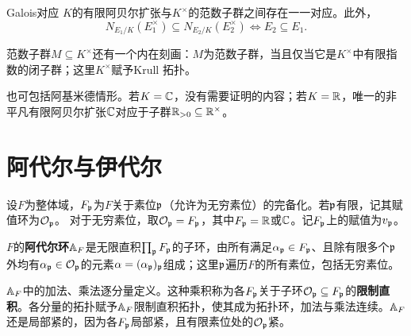 \begin{theorem}{Galois对应}\label{L3S2O3}
$K$的有限阿贝尔扩张与$K^\times$的范数子群之间存在一一对应。此外，
\[N_{E_1/K}(E_1^\times)\subseteq N_{E_2/K}(E_2^\times)\iff E_2\subseteq E_1.\]
\end{theorem}
\begin{note}[L3S2O4]
范数子群$M\subseteq K^\times$还有一个内在刻画：$M$为范数子群，当且仅当它是$K^\times$中有限指数的闭子群；这里$K^\times$赋予Krull 拓扑。
\end{note}
\begin{note}[L3S2O5]
也可包括阿基米德情形。若$K=\mathbb{C}$，没有需要证明的内容；若$K=\mathbb{R}$，唯一的非平凡有限阿贝尔扩张$\mathbb{C}$对应于子群$\mathbb{R}_{>0}\subseteq\mathbb{R}^\times$。
\end{note}
\section{阿代尔与伊代尔}\label{L3S3}
设$F$为整体域，$F_{\mathfrak{p}}$为$F$关于素位$\mathfrak{p}$（允许为无穷素位）的完备化。若$\mathfrak{p}$有限，记其赋值环为$\mathcal O_{\mathfrak{p}}$。
对于无穷素位，取$\mathcal O_{\mathfrak{p}}=F_{\mathfrak{p}}$，其中$F_{\mathfrak{p}}=\mathbb{R}$或$\mathbb{C}$。记$F_{\mathfrak{p}}$上的赋值为$v_{\mathfrak{p}}$。

$F$的\textbf{阿代尔环}$\mathbb{A}_F$是无限直积$\prod_{\mathfrak{p}}F_{\mathfrak{p}}$的子环，由所有满足$\alpha_{\mathfrak{p}}\in F_{\mathfrak{p}}$、且除有限多个$\mathfrak{p}$外均有$\alpha_{\mathfrak{p}}\in\mathcal O_{\mathfrak{p}}$的元素$\alpha=(\alpha_{\mathfrak{p}})_{\mathfrak{p}}$组成；这里$\mathfrak{p}$遍历$F$的所有素位，包括无穷素位。

$\mathbb{A}_F$中的加法、乘法逐分量定义。这种乘积称为各$F_{\mathfrak{p}}$关于子环$\mathcal O_{\mathfrak{p}}\subseteq F_{\mathfrak{p}}$的\textbf{限制直积}。各分量的拓扑赋予$\mathbb{A}_F$限制直积拓扑，使其成为拓扑环，加法与乘法连续。$\mathbb{A}_F$还是局部紧的，因为各$F_{\mathfrak{p}}$局部紧，且有限素位处的$\mathcal O_{\mathfrak{p}}$紧。

